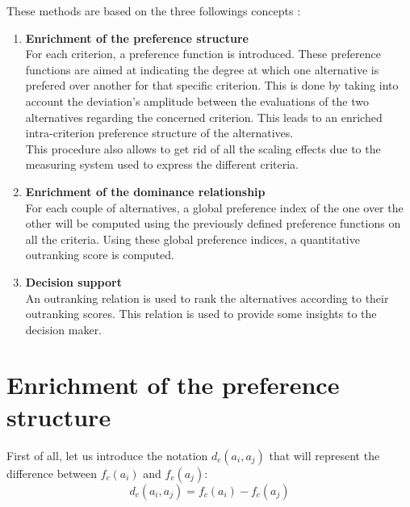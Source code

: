 These methods are based on the three followings concepts \cite{Bertrand2002}:
\begin{enumerate}
    \item \textbf{Enrichment of the preference structure } \\
        For each criterion, a preference function is introduced.
        These preference functions are aimed at indicating the degree at which one alternative is prefered over another for that specific criterion.
        This is done by taking into account the deviation's amplitude between the evaluations of the two alternatives regarding the concerned criterion.
        This leads to an enriched intra-criterion preference structure of the alternatives. \\
        This procedure also allows to get rid of all the scaling effects due to the measuring system used to express the different criteria.
    \item \textbf{Enrichment of the dominance relationship} \\
        For each couple of alternatives, a global preference index of the one over the other will be computed using the previously defined preference functions on all the criteria.
        Using these global preference indices, a quantitative outranking score is computed.
    \item \textbf{Decision support} \\
        An outranking relation is used to rank the alternatives according to their outranking scores. This relation is used to provide some insights to the decision maker.
\end{enumerate}

\section{Enrichment of the preference structure}
\label{sec:pref_struct}

First of all, let us introduce the notation $d_c(a_i,a_j)$ that will represent the difference between $f_c(a_i)$ and $f_c(a_j)$:
\begin{equation}
    d_c(a_i,a_j) = f_c(a_i) - f_c(a_j)
    \label{eq:dc}
\end{equation}

